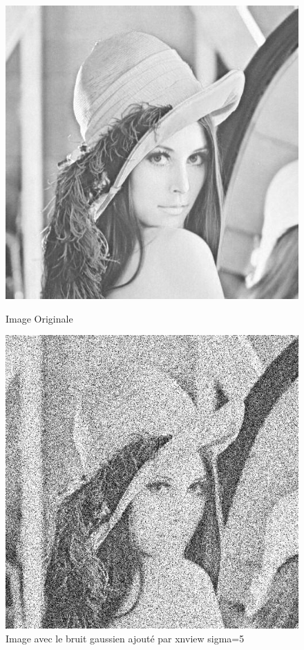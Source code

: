 \documentclass[12pt,a4paper]{report}
\numberwithin{equation}{subsection}
\numberwithin{equation}{section}
\begin{document}
\begin{figure}
  \begin{minipage}[t]{0.45\textwidth} %
    \includegraphics[width=\linewidth]{lena.jpg}
    \caption{Image Originale}
  \end{minipage}%
  \hfill
  \begin{minipage}[t]{0.45\textwidth}
    \includegraphics[width=\linewidth]{lena_bruit_gaussien_alpha.jpg}
    \caption{Image avec le bruit gaussien ajouté par xnview sigma=5}
  \end{minipage}
\end{figure}
\end{document}
